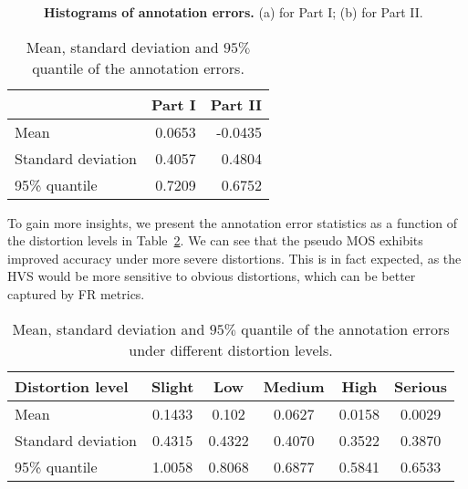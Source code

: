 \documentclass[acmsmall]{acmart}
\begin{document}
\begin{figure}[htbp]
\centering
  \centering
\caption{{\bf Histograms of annotation errors.} (a) for Part I; (b) for Part II.}
  \label{histogramsMOSandPseusoMOS}
\end{figure}

\begin{table}[htbp]
  \centering
  \caption{Mean, standard deviation and $95\%$ quantile of the annotation errors.}
  \begin{footnotesize}
    \begin{tabular}{l|r|r}
    \hline
          & \multicolumn{1}{l|}{Part I} & \multicolumn{1}{l}{Part II} \\
    \hline
    Mean  & 0.0653 & -0.0435 \\
    \hline
    Standard deviation & 0.4057 & 0.4804 \\
    \hline
    95\% quantile & 0.7209 & 0.6752 \\
    \hline
    \end{tabular}\end{footnotesize}
  \label{StatisticalAnalysis}\end{table}

\par To gain more insights, we present the annotation error statistics as a function of the distortion levels in Table~\ref{StatisticalWithDisLevel}. We can see that the pseudo MOS exhibits improved accuracy under more severe distortions. This is in fact expected, as the HVS would be more sensitive to obvious distortions, which can be better captured by FR metrics.

\begin{table}[htbp]
  \centering
  \caption{Mean, standard deviation and $95\%$ quantile of the annotation errors under different distortion levels.}
  \begin{footnotesize}
    \begin{tabular}{l|c|c|c|c|c}
    \hline
    Distortion level & Slight & Low   & Medium & High  & Serious \\
    \hline
    Mean  & 0.1433 & 0.102 & 0.0627 & 0.0158 & 0.0029 \\
    \hline
    Standard deviation   & 0.4315 & 0.4322 & 0.4070 & 0.3522 & 0.3870 \\
    \hline
    95\% quantile & 1.0058 & 0.8068 & 0.6877 & 0.5841 & 0.6533 \\
    \hline
    \end{tabular}\end{footnotesize}
  \label{StatisticalWithDisLevel}\end{table}
\end{document}
